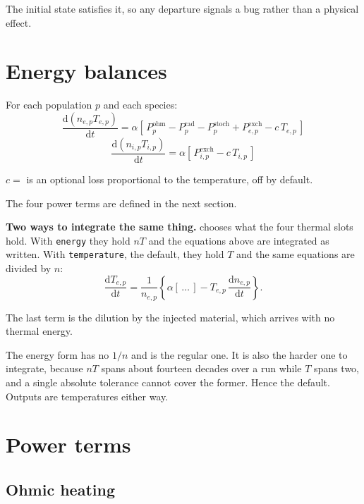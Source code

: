 \documentclass[11pt,a4paper]{article}
\newcommand{\dd}[2]{\frac{\mathrm{d}#1}{\mathrm{d}#2}}
\begin{document}
The initial state satisfies it, so any departure signals a bug rather than a physical effect.

\section{Energy balances}

For each population $p$ and each species:
\begin{equation}
\boxed{\;
  \dd{\left(n_{e,p} T_{e,p}\right)}{t}
    = \alpha \left[\, P^{\mathrm{ohm}}_p - P^{\mathrm{rad}}_p - P^{\mathrm{stoch}}_p
                    + P^{\mathrm{exch}}_{e,p} - c\, T_{e,p} \,\right] \;}
\end{equation}
\begin{equation}
\boxed{\;
  \dd{\left(n_{i,p} T_{i,p}\right)}{t}
    = \alpha \left[\, P^{\mathrm{exch}}_{i,p} - c\, T_{i,p} \,\right] \;}
\end{equation}

$c = $  is an optional loss proportional to the
temperature, off by default.

The four power terms are defined in the next section.

\textbf{Two ways to integrate the same thing.}  chooses what
the four thermal slots hold. With \texttt{energy} they hold $nT$ and the equations above are
integrated as written. With \texttt{temperature}, the default, they hold $T$ and the same
equations are divided by $n$:
\begin{equation}
  \dd{T_{e,p}}{t} = \frac{1}{n_{e,p}}
    \left\{ \alpha \left[\, \dots \,\right] - T_{e,p}\, \dd{n_{e,p}}{t} \right\} .
\end{equation}

The last term is the dilution by the injected material, which arrives with no thermal energy.

The energy form has no $1/n$ and is the regular one. It is also the harder one to integrate,
because $nT$ spans about fourteen decades over a run while $T$ spans two, and a single absolute
tolerance cannot cover the former. Hence the default. Outputs are temperatures either way.

\section{Power terms}

\subsection*{Ohmic heating}
\end{document}
